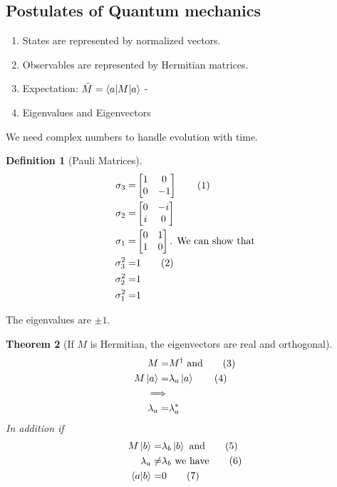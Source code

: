 \documentclass[]{article}
\newcommand\numberthis{\addtocounter{equation}{1}\tag{\theequation}}
\newtheorem{thm}{Theorem}
\newtheorem{defn}[thm]{Definition}
\begin{document}
\subsection{Postulates of Quantum mechanics}

\begin{enumerate}
	\item States are represented by normalized vectors.
	\item Observables are represented by Hermitian matrices.
	\item Expectation: $\bar{M}=\braket{a|M|a}$ - 
	\item Eigenvalues and Eigenvectors
\end{enumerate}


We need complex numbers to handle evolution with time.

\begin{defn}[Pauli Matrices]
	\begin{align*}
		\sigma_3 =& \begin{bmatrix} 1&0\\
			0&-1
		\end{bmatrix} \numberthis \label{eq:sigmas} \\
		\sigma_2 =& \begin{bmatrix}
			0 & -i\\
			i & 0
		\end{bmatrix}\\
		\sigma_1 =& \begin{bmatrix} 0&1\\
			1&0
		\end{bmatrix} \text{. We can show that}\\
		\sigma_3^2 =& 1 \numberthis \label{eq:sigma_sq}\\
		\sigma_2^2 =& 1\\
		\sigma_1^2 =& 1
	\end{align*}
\end{defn}

The eigenvalues are $\pm1$.


\begin{thm}[If $M$ is Hermitian,  the eigenvectors are real and orthogonal]
	\begin{align*}
		M =& M^\dagger \text{ and} \numberthis \label{eq:hermitian}\\
		M \ket{a} =& \lambda_a \ket{a} \numberthis \label{eq:sigma_ev1}\\
		\implies&\\
		\lambda_a =&\lambda_a^*
	\end{align*}
	In addition if
	\begin{align*}
		M \ket{b} =& \lambda_b \ket{b}\text{ and} \numberthis \label{eq:sigma_ev2}\\
		\lambda_a \ne& \lambda_b \text{ we have} \numberthis \label{eq:ne} \\
		\braket{a \vert b} =& 0 \numberthis \label{eq:orthogonal}
	\end{align*}
\end{thm}
\end{document}
